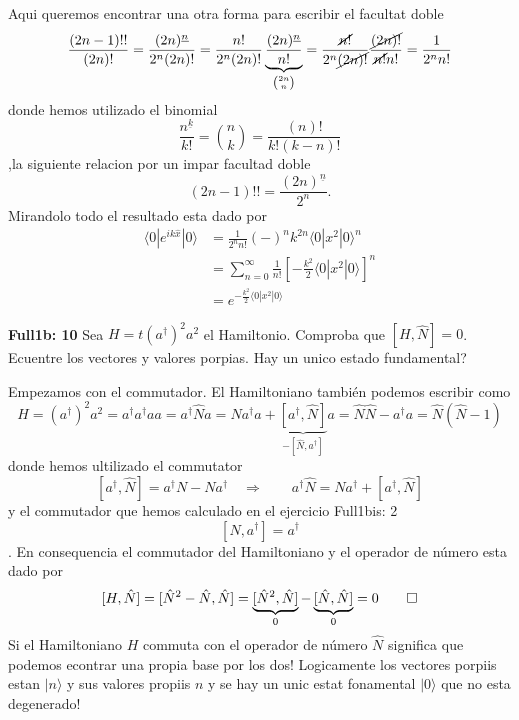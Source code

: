 Aqui queremos encontrar una otra forma para escribir el facultat doble
$$
	\frac{(2n-1)!!}{(2n)!} = \frac{(2n)^{\underline{n}}}{2^n (2n)!} =
\frac{n!}{2^n(2n)!} \underbrace{\frac{(2n)^{\underline{n}}}{n!}}_{\binom{2n}{n}}
= \frac{\cancel{n!}}{2^n \cancel{(2n)!}} \frac{\cancel{(2n)!}}{\cancel{n!} n!} =
\frac{1}{2^n n!}
$$
donde hemos utilizado el binomial
$$
	\frac{n^{\underline{k}}}{k!} = \binom{n}{k} = \frac{(n)!}{k!(k-n)!}
$$ 
,la siguiente relacion por un impar facultad doble
$$
	(2n - 1)!! = \frac{(2n)^{\underline{n}}}{2^n}.
$$
Mirandolo todo el resultado esta dado por
\begin{align*}
	\langle 0 | e^{ik\hat x} | 0 \rangle &= \frac{1}{2^n n!} (-)^n k^{2n} \langle
0 | x^2 | 0 \rangle^n  \\
	&= \sum_{n=0}^\infty \frac{1}{n!} \left[ - \frac{k^2}{2} \langle 0 | x^2 | 0
\rangle \right]^n \\
	&= e^{-\frac{k^2}{2} \langle 0 | x^2 | 0 \rangle}
\end{align*}

\begin{ejercicio}
\textbf{Full1b: 10} Sea $H = t (a^{\dagger})^2 a^2$ el Hamiltonio. Comproba que $[H, \hat N] =
0$. Ecuentre los vectores y valores porpias. Hay un unico estado fundamental?
\end{ejercicio}
\begin{solucion}
Empezamos con el commutador. El Hamiltoniano también podemos escribir como
$$
	H = (a^\dagger)^2 a^2 = a^\dagger a^\dagger a a = a^\dagger \hat N a = \hat
N a^\dagger a + \underbrace{[a^\dagger, \hat N]}_{-[\hat N, a^\dagger]}a = \hat
N \hat N - a^\dagger a = \hat N ( \hat N - 1) 
$$
donde hemos ultilizado el commutator 
$$
	[a^\dagger, \hat N] = a^\dagger N - N a^\dagger \quad \Rightarrow \qquad
a^\dagger \hat N = N a^\dagger + [a^\dagger, \hat N]
$$ y el commutador que hemos calculado en el ejercicio Full1bis: 2
$$
	[N, a^\dagger] = a^\dagger
$$.
En consequencia el commutador del Hamiltoniano y el operador de número esta dado
por
$$
	[H, \hat N] = [\hat N^2 - \hat N, \hat N] = \underbrace{[\hat N^2, \hat
N]}_0 - \underbrace{[\hat N, \hat N]}_0 = 0 \qed
$$
Si el Hamiltoniano $H$ commuta con el operador de número $\hat N$ significa que
podemos econtrar una propia base por los dos! Logicamente los vectores porpiis
estan $|n\rangle$ y sus valores propiis $n$ y se hay un unic estat fonamental
$|0\rangle$ que no esta degenerado! 
\end{solucion}

